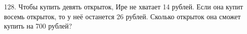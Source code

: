 128. Чтобы купить девять открыток, Ире не хватает 14 рублей. Если она купит восемь открыток, то у неё останется 26 рублей. Сколько открыток она сможет купить на 700 рублей?\\
